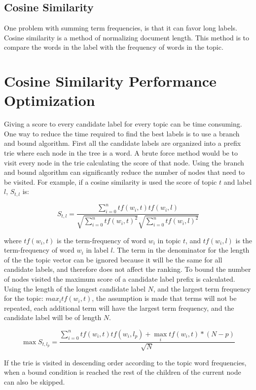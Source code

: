 \subsection{Cosine Similarity}
One problem with summing term frequencies, is that it can favor long labels.  Cosine similarity is a method of normalizing document length.  This method is to compare the words in the label with the frequency of words in the topic.

\section{Cosine Similarity Performance Optimization}
Giving a score to every candidate label for every topic can be time consuming.  One way to reduce the time required to find the best labels is to use a branch and bound algorithm.  First all the candidate labels are organized into a prefix trie where each node in the tree is a word.  A brute force method would be to visit every node in the trie calculating the score of that node.  Using the branch and bound algorithm can significantly reduce the number of nodes that need to be visited.  For example, if a cosine similarity is used the score of topic $t$ and label $l$, $S_{t,l}$ is:

\begin{equation}
S_{t,l} = \frac{\sum_{i=0}^{n} tf(w_i,t)tf(w_i,l)}{\sqrt{\sum_{i=0}^{n} tf(w_i,t)^2}\sqrt{\sum_{i=0}^{n} tf(w_i,l)^2}}
\end{equation}

where $tf(w_i,t)$ is the term-frequency of word $w_i$ in topic $t$, and $tf(w_i,l)$ is the term-frequency of word $w_i$ in label $l$.  The term in the denominator for the length of the the topic vector can be ignored because it will be the same for all candidate labels, and therefore does not affect the ranking.  To bound the number of nodes visited the maximum score of a candidate label prefix is calculated.  Using the length of the longest candidate label $N$, and the largest term frequency for the topic:  $max_i tf(w_i,t)$, the assumption is made that terms will not be repeated, each additional term will have the largest term frequency, and the candidate label will be of length $N$.

\begin{equation}
\max S_{t,l_p} = \frac{\sum_{i=0}^{n} tf(w_i,t)tf(w_i,l_p) + \max_i tf(w_i,t) * (N-p)}{\sqrt{N}}
\end{equation}

If the trie is visited in descending order according to the topic word frequencies, when a bound condition is reached the rest of the children of the current node can also be skipped.

